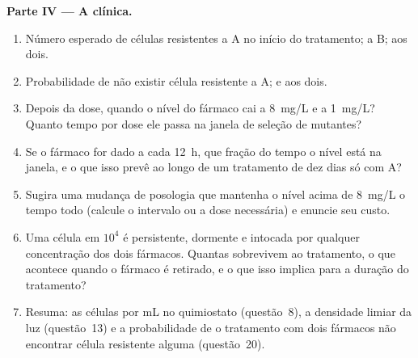 \begin{problem}
\medskip
\noindent\textbf{Parte IV --- A clínica.}
\begin{enumerate}[resume]
  \item Número esperado de células resistentes a A no início do
        tratamento; a B; aos dois.
  \item Probabilidade de não existir célula resistente a A; e aos dois.
  \item Depois da dose, quando o nível do fármaco cai a \qty{8}{mg/L} e
        a \qty{1}{mg/L}? Quanto tempo por dose ele passa na janela de
        seleção de mutantes?
  \item Se o fármaco for dado a cada \qty{12}{h}, que fração do tempo o
        nível está na janela, e o que isso prevê ao longo de um
        tratamento de dez dias só com A?
  \item Sugira uma mudança de posologia que mantenha o nível acima de
        \qty{8}{mg/L} o tempo todo (calcule o intervalo ou a dose
        necessária) e enuncie seu custo.
  \item Uma célula em $10^{4}$ é persistente, dormente e intocada por
        qualquer concentração dos dois fármacos. Quantas sobrevivem ao
        tratamento, o que acontece quando o fármaco é retirado, e o que
        isso implica para a duração do tratamento?
  \item Resuma: as células por mL no quimiostato (questão~8), a
        densidade limiar da luz (questão~13) e a probabilidade de o
        tratamento com dois fármacos não encontrar célula resistente
        alguma (questão~20).
\end{enumerate}
\end{problem}
